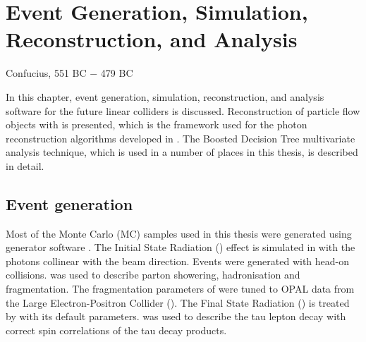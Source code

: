 \chapter{Event Generation, Simulation, Reconstruction, and Analysis}
\label{chap:Reconstruction}

%
{Confucius, 551 BC $-$ 479 BC}%





In this chapter, event generation, simulation, reconstruction, and analysis software for the future linear colliders is discussed. Reconstruction of particle flow objects with \pandora is presented, which is the framework used for the photon reconstruction algorithms developed in . The Boosted Decision Tree multivariate analysis technique, which is used in a number of places in this thesis, is described in detail.



\section{Event generation}
\label{sec:pandoraMC}

Most of the Monte Carlo (MC) samples used in this thesis were generated using \WHIZARD generator software \cite{whizard,Moretti:2001zz}. The Initial State Radiation (\ISR) effect is simulated in \WHIZARD with the \ISR photons  collinear with the beam direction. Events were generated with head-on \ee collisions. \PYTHIA \cite{Sjostrand:1995iq} was used to describe parton showering, hadronisation and fragmentation. The fragmentation parameters of \PYTHIA were tuned to OPAL data \cite{Alexander:1995bk} from the Large Electron-Positron Collider (\LEP). The Final State Radiation (\FSR) is treated by \PYTHIA with its default parameters. \TAUOLA \cite{Jadach:1993hs} was used to describe the tau lepton decay with correct spin correlations of the tau decay products.

